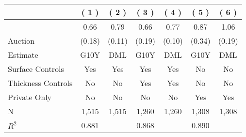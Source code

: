
\begin{tabular}{lcccccc}
\toprule
 & ( 1 ) & ( 2 ) & ( 3 ) & ( 4 ) & ( 5 ) & ( 6 )\\
\midrule
 & 0.66 & 0.79 & 0.66 & 0.77 & 0.87 & 1.06\\

\multirow{-2}{*}{\raggedright\arraybackslash Auction} & (0.18) & (0.11) & (0.19) & (0.10) & (0.34) & (0.19)\\

\midrule
Estimate & G10Y & DML & G10Y & DML & G10Y & DML\\

Surface Controls & Yes & Yes & Yes & Yes & No & No\\

Thickness Controls & No & No & Yes & Yes & No & No\\

Private Only & No & No & No & No & Yes & Yes\\

N & 1,515 & 1,515 & 1,260 & 1,260 & 1,308 & 1,308\\

$R^2$ & 0.881 &  & 0.868 &  & 0.890 & \\
\bottomrule
\end{tabular}
